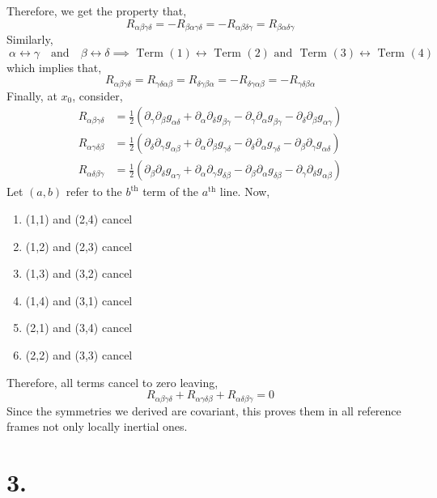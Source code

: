 \documentclass[12pt]{article}
\begin{document}
Therefore, we get the property that, 
\[R_{\alpha\beta\gamma\delta} = -R_{\beta\alpha \gamma\delta} =-R_{\alpha\beta\delta\gamma} = R_{\beta \alpha \delta \gamma}\]
Similarly, 
\[\ \alpha\leftrightarrow \gamma \quad \text{and} \quad \beta\leftrightarrow\delta \implies \text{ Term $(1)$} \leftrightarrow \text{ Term $(2)$} \text{ and } \text{ Term $(3)$} \leftrightarrow \text{ Term $(4)$}\]
which implies that, 
\[R_{\alpha\beta\gamma\delta} = R_{\gamma\delta\alpha\beta} = R_{\delta\gamma\beta \alpha} = -R_{\delta\gamma\alpha\beta} = - R_{\gamma\delta\beta\alpha}\]
Finally, at $x_0$, consider,
\begin{align*}
R_{\alpha \beta \gamma \delta} & = \tfrac{1}{2}\left( \partial_\gamma\partial_\beta g_{\alpha\delta} + \partial_\alpha\partial_\delta g_{\beta\gamma} - \partial_\gamma\partial_\alpha g_{\beta\gamma} - \partial_\delta\partial_\beta g_{\alpha\gamma} \right)
\\
R_{\alpha \gamma \delta \beta} & = \tfrac{1}{2}\left( \partial_\delta \partial_\gamma g_{\alpha\beta} + \partial_\alpha\partial_\beta g_{\gamma\delta} - \partial_\delta\partial_\alpha g_{\gamma\delta} - \partial_\beta\partial_\gamma g_{\alpha\delta} \right)
\\
R_{\alpha \delta \beta \gamma} & = \tfrac{1}{2}\left( \partial_\beta\partial_\delta g_{\alpha\gamma} + \partial_\alpha\partial_\gamma g_{\delta\beta} - \partial_\beta\partial_\alpha g_{\delta\beta} - \partial_\gamma\partial_\delta g_{\alpha\beta} \right) 
\end{align*}
Let $(a, b)$ refer to the $b^{\text{th}}$ term of the $a^{\text{th}}$ line. Now,
\begin{enumerate}
\item (1,1) and (2,4) cancel
\item (1,2) and (2,3) cancel
\item (1,3) and (3,2) cancel
\item (1,4) and (3,1) cancel
\item (2,1) and (3,4) cancel
\item (2,2) and (3,3) cancel
\end{enumerate}
Therefore, all terms cancel to zero leaving,
\[ R_{\alpha \beta \gamma \delta} + R_{\alpha \gamma \delta \beta} + R_{\alpha \delta \beta \gamma} = 0 \]
Since the symmetries we derived are covariant, this proves them in all reference frames not only locally inertial ones.
\section*{3.}
\end{document}
